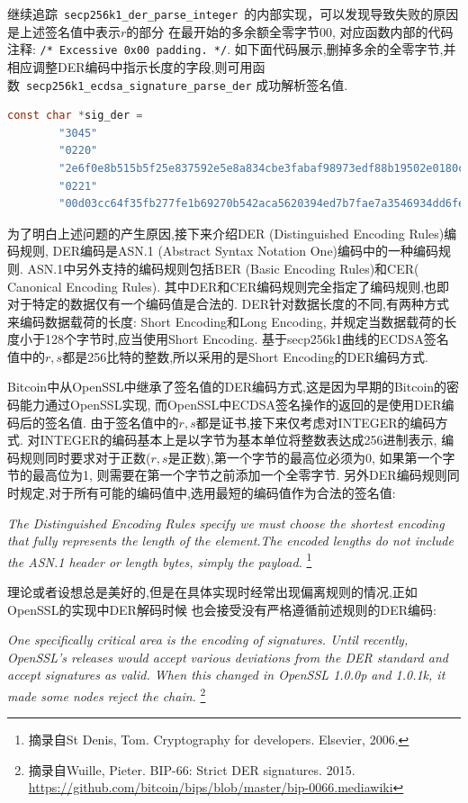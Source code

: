 \documentclass{article}
\newcommand{\code}[1]{\lstinline!#1!}
\begin{document}
继续追踪~\code{secp256k1_der_parse_integer}~的内部实现，可以发现导致失败的原因是上述签名值中表示$r$的部分
在最开始的多余额全零字节$00$, 对应函数内部的代码注释: \code{/* Excessive 0x00 padding. */}.
如下面代码展示,删掉多余的全零字节,并相应调整DER编码中指示长度的字段,则可用函数~\code{secp256k1_ecdsa_signature_parse_der}
成功解析签名值.

\begin{lstlisting}[language=c, caption = 可成功解析的DER编码的ECDSA签名, label=lst-gooddersig]
    const char *sig_der =
        "3045"
        "0220"
        "2e6f0e8b515b5f25e837592e5e8a834cbe3fabaf98973edf88b19502e0180c2d"
        "0221"
        "00d03cc64f35fb277fe1b69270b542aca5620394ed7b7fae7a3546934dd6fe4288";
\end{lstlisting}

为了明白上述问题的产生原因,接下来介绍DER (Distinguished Encoding Rules)编码规则,
DER编码是ASN.1 (Abstract Syntax Notation One)编码中的一种编码规则. 
ASN.1中另外支持的编码规则包括BER (Basic Encoding Rules)和CER( Canonical Encoding Rules).
其中DER和CER编码规则完全指定了编码规则,也即对于特定的数据仅有一个编码值是合法的.
DER针对数据长度的不同,有两种方式来编码数据载荷的长度: Short Encoding和Long Encoding, 
并规定当数据载荷的长度小于128个字节时,应当使用Short Encoding. 
基于secp256k1曲线的ECDSA签名值中的$r, s$都是256比特的整数,所以采用的是Short Encoding的DER编码方式.

Bitcoin中从OpenSSL中继承了签名值的DER编码方式,这是因为早期的Bitcoin的密码能力通过OpenSSL实现,
而OpenSSL中ECDSA签名操作的返回的是使用DER编码后的签名值.
由于签名值中的$r,s$都是证书,接下来仅考虑对INTEGER的编码方式.
对INTEGER的编码基本上是以字节为基本单位将整数表达成256进制表示,
编码规则同时要求对于正数($r,s$是正数),第一个字节的最高位必须为0,
如果第一个字节的最高位为1, 则需要在第一个字节之前添加一个全零字节.
另外DER编码规则同时规定,对于所有可能的编码值中,选用最短的编码值作为合法的签名值:

\textit{
The Distinguished Encoding Rules specify we must choose the shortest encoding that fully represents the length of the element.The encoded lengths do not include the ASN.1 header or length bytes, simply the payload.
}\footnote{
摘录自St Denis, Tom. Cryptography for developers. Elsevier, 2006.}

理论或者设想总是美好的,但是在具体实现时经常出现偏离规则的情况,正如OpenSSL的实现中DER解码时候
也会接受没有严格遵循前述规则的DER编码:

\textit{
One specifically critical area is the encoding of signatures. Until recently, OpenSSL's releases would accept various deviations from the DER standard and accept signatures as valid. When this changed in OpenSSL 1.0.0p and 1.0.1k, it made some nodes reject the chain.
}\footnote{
摘录自Wuille, Pieter. BIP-66: Strict DER signatures. 2015. \url{https://github.com/bitcoin/bips/blob/master/bip-0066.mediawiki}
}
\end{document}
